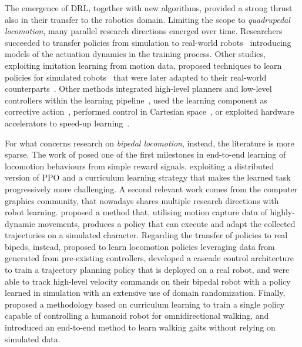 \pagebreak[1]
The emergence of \ac{DRL}, together with new algorithms, provided a strong thrust also in their transfer to the robotics domain.
Limiting the scope to \emph{quadrupedal locomotion}, many parallel research directions emerged over time.
Researchers succeeded to transfer policies from simulation to real-world robots~\parencite{tan_sim--real_2018, hwangboLearningAgileDynamic2019s} introducing
models of the actuation dynamics in the training process.
Other studies, exploiting imitation learning from motion data, proposed techniques to learn policies for simulated robots~\parencite{peng_learning_2020} that were later adapted to their real-world counterparts~\parencite{smith_legged_2021}.
Other methods integrated high-level planners and low-level controllers within the learning pipeline~\parencite{tsounis_deepgait_2020}, used the learning component as corrective action~\parencite{gangapurwala_real-time_2021}, performed control in Cartesian space~\parencite{bellegarda_robust_2021}, or exploited hardware accelerators to speed-up learning~\parencite{rudin_learning_2021}.

For what concerns research on \emph{bipedal locomotion}, instead, the literature is more sparse.
The work of \textcite{heess_emergence_2017} posed one of the first milestones in end-to-end learning of locomotion behaviours from simple reward signals, exploiting a distributed version of \ac{PPO} and a curriculum learning strategy that makes the learned task progressively more challenging.
A second relevant work comes from the computer graphics community, that nowadays shares multiple research directions with robot learning.
\textcite{peng_deepmimic_2018} proposed a method that, utilising motion capture data of highly-dynamic movements, produces a policy that can execute and adapt the collected trajectories on a simulated character.
Regarding the transfer of policies to real bipeds, instead, \textcite{xieIterativeReinforcementLearning2019s} proposed to learn locomotion policies leveraging data from generated from pre-existing controllers, \textcite{castillo_robust_2021} developed a cascade control architecture to train a trajectory planning policy that is deployed on a real robot, and \textcite{li_reinforcement_2021} were able to track high-level velocity commands on their bipedal robot with a policy learned in simulation with an extensive use of domain randomization.
Finally, \textcite{rodriguez_deepwalk_2021} proposed a methodology based on curriculum learning to train a single policy capable of controlling a humanoid robot for omnidirectional walking, and \textcite{bloesch_towards_2022} introduced an end-to-end method to learn walking gaits without relying on simulated data.

